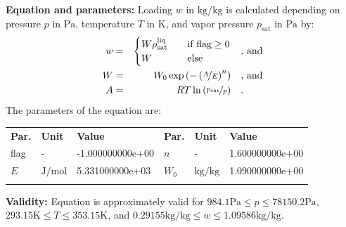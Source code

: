 \textbf{Equation and parameters:}
\newline
%
Loading $w$ in $\si{\kilogram\per\kilogram}$ is calculated depending on pressure $p$ in $\si{\pascal}$, temperature $T$ in $\si{\kelvin}$, and vapor pressure $p_\mathrm{sat}$ in $\si{\pascal}$ by:
%
\begin{equation*}
\begin{split}
w &=& \begin{cases} W \rho_\mathrm{sat}^{\mathrm{liq}} & \quad \text{if flag} \geq 0 \\ W & \quad \text{else} \end{cases} & \quad\text{, and} \\
W &=& W_0 \exp \left( - \left( \nicefrac{A}{E} \right) ^{n} \right) & \quad\text{, and} \\
A &=& R T \ln \left( \nicefrac{p_\mathrm{sat}}{p} \right) & \quad\text{.} \\
\end{split}
\end{equation*}
%
The parameters of the equation are:
%
\begin{longtable}[l]{lll|lll}
\toprule
\addlinespace
\textbf{Par.} & \textbf{Unit} & \textbf{Value} &	\textbf{Par.} & \textbf{Unit} & \textbf{Value} \\
\addlinespace
\midrule
\endhead

\bottomrule
\endfoot
\bottomrule
\endlastfoot
\addlinespace

flag & - & -1.000000000e+00 & $n$ & - & 1.600000000e+00 \\
$E$ & $\si{\joule\per\mole}$ & 5.331000000e+03 & $W_0$ & $\si{\kilogram\per\kilogram}$ & 1.090000000e+00 \\

\addlinespace\end{longtable}

\textbf{Validity:}
\newline
Equation is approximately valid for $984.1 \si{\pascal} \leq p \leq 78150.2 \si{\pascal}$,  $293.15 \si{\kelvin} \leq T \leq 353.15 \si{\kelvin}$, and $0.29155 \si{\kilogram\per\kilogram} \leq w \leq 1.09586 \si{\kilogram\per\kilogram}$.
\newline

